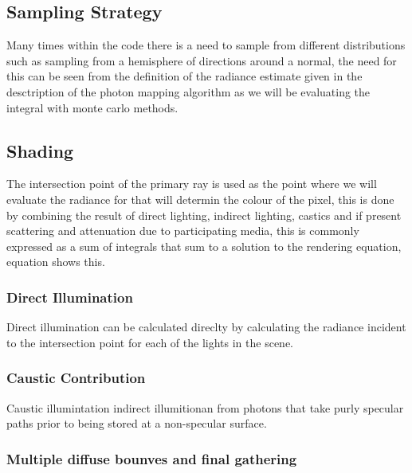 
\subsection{Sampling Strategy}
Many times within the code there is a need to sample from different distributions such as sampling from a hemisphere
of directions around a normal, the need for this can be seen from the definition of the radiance estimate given in
the desctription of the photon mapping algorithm as we will be evaluating the integral with monte carlo methods.

\subsection{Shading}
The intersection point of the primary ray is used as the point where we will evaluate the radiance for that will determin
the colour of the pixel, this is done by combining the result of direct lighting, indirect lighting, castics and if present
scattering and attenuation due to participating media, this is commonly expressed as a sum of integrals that sum to a solution
to the rendering equation, equation  shows this.

\subsubsection{Direct Illumination}
Direct illumination can be calculated direclty by calculating the radiance incident to the intersection point for each of the
lights in the scene.


\subsubsection{Caustic Contribution}
Caustic illumintation indirect illumitionan from photons that take purly specular paths prior to being stored at a non-specular
surface.

\subsubsection{Multiple diffuse bounves and final gathering}

